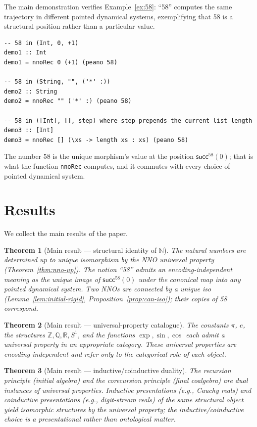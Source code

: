 \documentclass[12pt]{article}
\newtheorem{theorem}{Theorem}[section]
\theoremstyle{definition}
\theoremstyle{remark}
\newcommand{\N}{\mathbb{N}}
\newcommand{\Z}{\mathbb{Z}}
\newcommand{\Q}{\mathbb{Q}}
\newcommand{\R}{\mathbb{R}}
\newcommand{\suc}{\mathsf{succ}}
\begin{document}
The main demonstration verifies Example~\ref{ex:58}: ``58'' computes the same trajectory in different pointed dynamical systems, exemplifying that 58 is a structural position rather than a particular value.

\begin{lstlisting}
-- 58 in (Int, 0, +1)
demo1 :: Int
demo1 = nnoRec 0 (+1) (peano 58)

-- 58 in (String, "", ('*' :))
demo2 :: String
demo2 = nnoRec "" ('*' :) (peano 58)

-- 58 in ([Int], [], step) where step prepends the current list length
demo3 :: [Int]
demo3 = nnoRec [] (\xs -> length xs : xs) (peano 58)
\end{lstlisting}

The number 58 is the unique morphism's value at the position $\suc^{58}(0)$; that is what the function \texttt{nnoRec} computes, and it commutes with every choice of pointed dynamical system.

\section{Results}
\label{sec:results}

We collect the main results of the paper.

\begin{theorem}[Main result --- structural identity of $\N$]
\label{thm:main-N}
The natural numbers are determined up to unique isomorphism by the NNO universal property (Theorem~\ref{thm:nno-up}). The notion ``58'' admits an encoding-independent meaning as the unique image of $\suc^{58}(0)$ under the canonical map into any pointed dynamical system. Two NNOs are connected by a unique iso (Lemma~\ref{lem:initial-rigid}, Proposition~\ref{prop:can-iso}); their copies of 58 correspond.
\end{theorem}

\begin{theorem}[Main result --- universal-property catalogue]
\label{thm:main-catalogue}
The constants $\pi$, $e$, the structures $\Z, \Q, \R, S^1$, and the functions $\exp, \sin, \cos$ each admit a universal property in an appropriate category. These universal properties are encoding-independent and refer only to the categorical role of each object.
\end{theorem}

\begin{theorem}[Main result --- inductive/coinductive duality]
\label{thm:main-duality}
The recursion principle (initial algebra) and the corecursion principle (final coalgebra) are dual instances of universal properties. Inductive presentations (e.g., Cauchy reals) and coinductive presentations (e.g., digit-stream reals) of the same structural object yield isomorphic structures by the universal property; the inductive/coinductive choice is a presentational rather than ontological matter.
\end{theorem}
\end{document}
